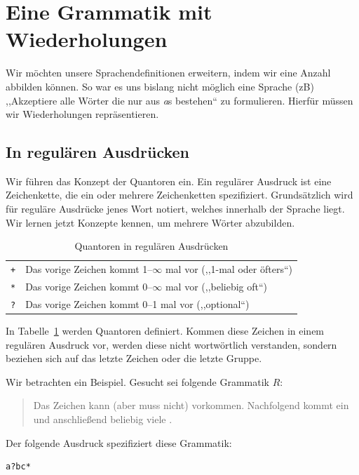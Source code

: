 \section{Eine Grammatik mit Wiederholungen}
%
Wir möchten unsere Sprachendefinitionen erweitern, indem wir eine Anzahl abbilden können. So war es uns bislang nicht möglich eine Sprache (zB) ,,Akzeptiere alle Wörter die nur aus \emph{a}s bestehen`` zu formulieren. Hierfür müssen wir Wiederholungen repräsentieren.

\subsection{In regulären Ausdrücken}
%
Wir führen das Konzept der Quantoren ein. Ein regulärer Ausdruck ist eine Zeichenkette, die ein oder mehrere Zeichenketten spezifiziert. Grundsätzlich wird für reguläre Ausdrücke jenes Wort notiert, welches innerhalb der Sprache liegt. Wir lernen jetzt Konzepte kennen, um mehrere Wörter abzubilden.
%
\begin{table}[ht]
 \begin{center}
  \begin{tabular}{cl}
   \hline
    \texttt{+} & Das vorige Zeichen kommt 1--$\infty$ mal vor (,,1-mal oder öfters``) \\
    \texttt{*} & Das vorige Zeichen kommt 0--$\infty$ mal vor (,,beliebig oft``) \\
    \texttt{?} & Das vorige Zeichen kommt 0--1 mal vor (,,optional``) \\
   \hline
  \end{tabular}
  \caption{Quantoren in regulären Ausdrücken}
  \label{tab:quantifiers}
 \end{center}
\end{table}

In Tabelle~\ref{tab:quantifiers} werden Quantoren definiert. Kommen diese Zeichen in einem regulären Ausdruck vor, werden diese nicht wortwörtlich verstanden, sondern beziehen sich auf das letzte Zeichen oder die letzte Gruppe.

Wir betrachten ein Beispiel. Gesucht sei folgende Grammatik $R$:
\begin{quote}
  Das Zeichen  kann (aber muss nicht) vorkommen. Nachfolgend kommt ein  und
  anschließend beliebig viele .
\end{quote}

Der folgende Ausdruck spezifiziert diese Grammatik:
\begin{lstlisting}
a?bc*
\end{lstlisting}


